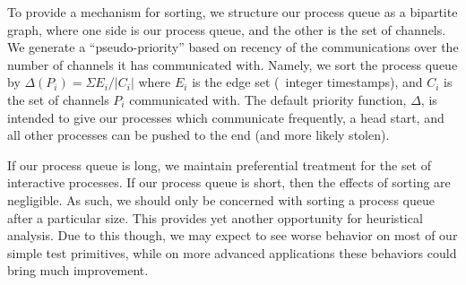 To provide a mechanism for sorting, we structure our process queue as a bipartite 
graph, where one side is our process queue, and the other is the set of channels.
We generate a ``pseudo-priority'' based on recency of the communications over
the number of channels it has communicated with. Namely, we sort the process queue
by $\Delta(P_i) = \Sigma E_i / |C_i|$ where $E_i$ is the edge set (\ie~integer timestamps),
and $C_i$ is the set of channels $P_i$ communicated with. The default priority function, $\Delta$,
is intended to give our processes which communicate frequently, a head start, and
all other processes can be pushed to the end (and more likely stolen). 

If our process queue is long, we maintain preferential treatment for the set of 
interactive processes. If our process queue is short, then the effects of 
sorting are negligible. As such, we should only be concerned with sorting a
process queue after a particular size. This provides yet another opportunity for
heuristical analysis. Due to this though, we may expect to see worse behavior
on most of our simple test primitives, while on more advanced applications
these behaviors could bring much improvement.

